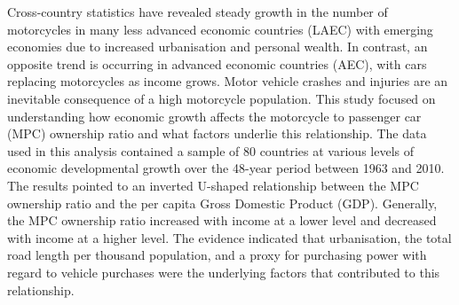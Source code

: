 Cross-country statistics have revealed steady growth in the number of motorcycles in many less advanced economic countries (LAEC) with emerging economies due to increased urbanisation and personal wealth. In contrast, an opposite trend is occurring in advanced economic countries (AEC), with cars replacing motorcycles as income grows. Motor vehicle crashes and injuries are an inevitable consequence of a high motorcycle population. This study focused on understanding how economic growth affects the motorcycle to passenger car (MPC) ownership ratio and what factors underlie this relationship. The data used in this analysis contained a sample of 80 countries at various levels of economic developmental growth over the 48-year period between 1963 and 2010. The results pointed to an inverted U-shaped relationship between the MPC ownership ratio and the per capita Gross Domestic Product (GDP). Generally, the MPC ownership ratio increased with income at a lower level and decreased with income at a higher level. The evidence indicated that urbanisation, the total road length per thousand population, and a proxy for purchasing power with regard to vehicle purchases were the underlying factors that contributed to this relationship.
